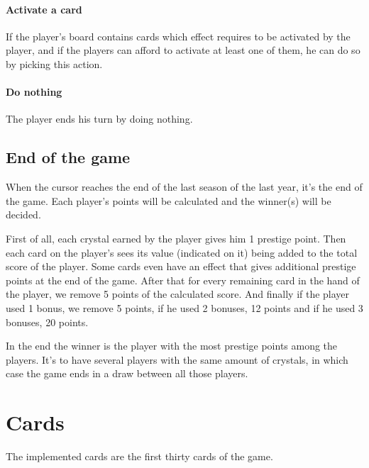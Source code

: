             \paragraph{Activate a card}
            If the player's board contains cards which effect requires to be activated by the player, and if the players can afford to activate at least one of them, he can do so by picking this action.
            
            \paragraph{Do nothing}
            The player ends his turn by doing nothing.
        
        \subsection{End of the game}
            When the cursor reaches the end of the last season of the last year, it's the end of the game. Each player's points will be calculated and the winner(s) will be decided.
            
            First of all, each crystal earned by the player gives him 1 prestige point.
            Then each card on the player's sees its value (indicated on it) being added to the total score of the player. Some cards even have an effect that gives additional prestige points at the end of the game.
            After that for every remaining card in the hand of the player, we remove 5 points of the calculated score.
            And finally if the player used 1 bonus, we remove 5 points, if he used 2 bonuses, 12 points and if he used 3 bonuses, 20 points.
            
            In the end the winner is the player with the most prestige points among the players. It's to have several players with the same amount of crystals, in which case the game ends in a draw between all those players.
        
    \newpage
    \section{Cards}
    The implemented cards are the first thirty cards of the game.
    
